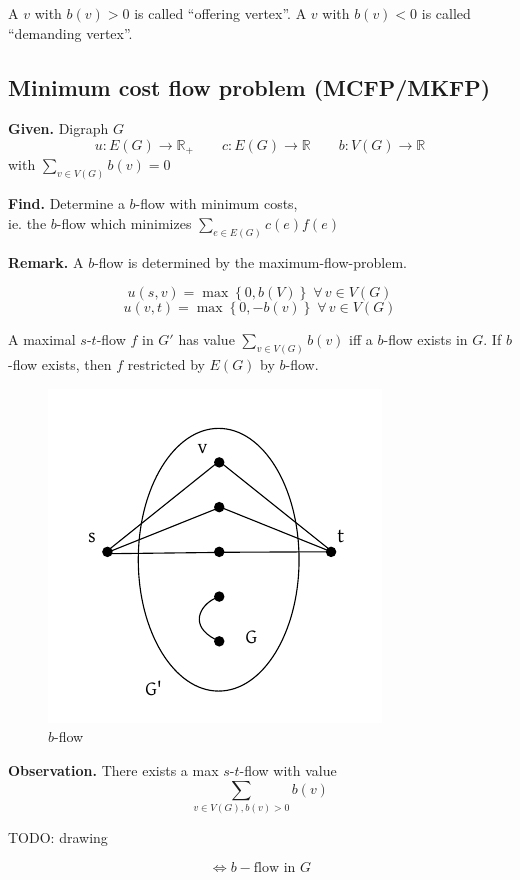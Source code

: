 \documentclass{article}
\newcommand{\set}[1]{\left\{#1\right\}}
\newcommand{\given}[1]{\textbf{Given.} #1\par}
\newcommand{\find}[1]{\textbf{Find.} #1\par}
\newcommand{\flow}[2]{$#1$-$#2$-flow}
\newcommand{\fall}{\;\forall\,}
\begin{document}
A $v$ with $b(v) > 0$ is called ``offering vertex''.
A $v$ with $b(v) < 0$ is called ``demanding vertex''.

\subsection{Minimum cost flow problem (MCFP/MKFP)}
%
\given{Digraph $G$
\[ u: E(G) \rightarrow \mathbb{R}_+
  \qquad c: E(G) \rightarrow \mathbb{R}
  \qquad b: V(G) \rightarrow \mathbb{R}
\] with $\sum_{v \in V(G)} b(v) = 0$}
\find{Determine a $b$-flow with minimum costs, \\
  ie. the $b$-flow which minimizes $\sum_{e \in E(G)} c(e) f(e)$
}

\textbf{Remark.}
  A $b$-flow is determined by the maximum-flow-problem.

\[
  u(s, v) = \max{\set{0, b(V)}} \fall v \in V(G)
\] \[
  u(v, t) = \max{\set{0, -b(v)}} \fall v \in V(G)
\]

A maximal \flow st $f$ in $G'$ has value $\sum_{v \in V(G)} b(v)$
iff a $b$-flow exists in $G$. If $b$-flow exists, then $f$ restricted by $E(G)$ by $b$-flow.

\begin{figure}[ht]
 \begin{center}
  \includegraphics{img/b_flow.pdf}
  \caption{$b$-flow}
 \end{center}
\end{figure}

\textbf{Observation.}
  There exists a max \flow st with value
  \[ \sum_{v \in V(G), b(v) > 0} b(v) \]

TODO: drawing

\[ \Leftrightarrow b-\text{flow in } G \]
\end{document}
